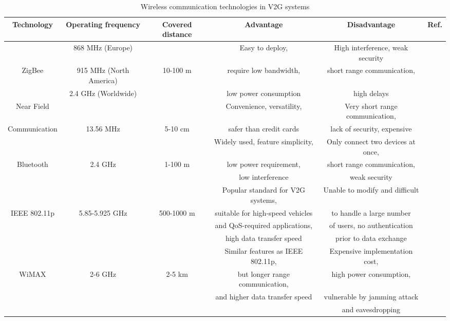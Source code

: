 \documentclass[twocolumn,10pt]{IEEEtran}
\begin{document}
\begin{table*}[!]
	\caption{Wireless communication technologies in V2G systems} %
	\centering %
	\begin{tabular}{|c|c|c|c|c|c|}
		\hline
		Technology & Operating frequency & Covered distance & Advantage & Disadvantage & Ref.	\\
		\hline
		\hline
		& 868 MHz (Europe) &   & Easy to deploy, 	& High interference, weak security	&	\\
		ZigBee 	& 915 MHz (North America) & 10-100 m & require low bandwidth, 	& short range communication,	&	\cite{Lam2011ZigBee} 	\\
				& 2.4 GHz (Worldwide) & 	& low power consumption 	& high delays	&	\\
		\hline
		Near Field &  & & Convenience, versatility,	& Very short range communication, &	 \\
		Communication  & 13.56 MHz & 5-10 cm & safer than credit cards & lack of security, expensive &	\cite{Steffen2010Near}	\\
		\hline
		 &  &   & Widely used, feature simplicity, 	 & Only connect two devices at once,   &		\\
		Bluetooth & 2.4 GHz & 1-100 m & low power requirement,   & short range communication, & \cite{Conti2011B4V2G} \\
		& & & low interference  &   weak security & \\
		\hline
		 &  &   & Popular standard for V2G systems,	& Unable to modify and difficult	&	\\
		IEEE 802.11p & 5.85-5.925 GHz & 500-1000 m & suitable for high-speed vehicles	&  to handle 	a large number & \cite{Anbagi2016WAVE}	\\
		 & & & and QoS-required applications,	&	of users,  no authentication	& \cite{Msadaa2010A comparative}	\\
		& & & high data transfer speed	&  prior to data exchange	&	\\
		\hline
		&  &  &	 Similar features as IEEE 802.11p, 	& Expensive implementation cost,	&	\\
		WiMAX  & 2-6 GHz & 2-5 km  & but longer range communication, & high power consumption, 	&	\cite{Msadaa2010A comparative}	\\
		& & & and higher data transfer speed &	vulnerable by jamming attack  & \cite{Jatav2014WiMAX}	\\
		& & & &	and eavesdropping  &	\\
		\hline
	\end{tabular}
	\label{tab:Wireless communication}
\end{table*}
\end{document}
